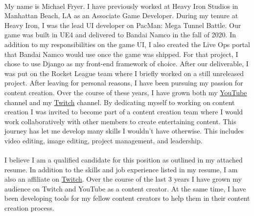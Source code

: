 \paragraph{}
My name is Michael Fryer. I have previously worked at Heavy Iron Studios in Manhattan Beach, LA as an Associate Game Developer. During my tenure at Heavy Iron, I was the lead UI developer on PacMan: Mega Tunnel Battle. Our game was built in UE4 and delivered to Bandai Namco in the fall of 2020. In addition to my responsibilities on the game UI, I also created the Live Ops portal that Bandai Namco would use once the game was shipped. For that project, I chose to use Django as my front-end framework of choice. After our deliverable, I was put on the Rocket League team where I briefly worked on a still unreleased project. After leaving for personal reasons, I have been pursuing my passion for content creation. Over the course of these years, I have grown both my \href{https://youtube.com/@humblehominid}{YouTube} channel and my \href{https://twitch.tv/HumbleHominid}{Twitch} channel. By dedicating myself to working on content creation I was invited to become part of a content creation team where I would work collaboratively with other members to create entertaining content. This journey has let me develop many skills I wouldn't have otherwise. This includes video editing, image editing, project management, and leadership.

\paragraph{}
I believe I am a qualified candidate for this position as outlined in my attached resume. In addition to the skills and job experience listed in my resume, I am also an affiliate on \href{https://twitch.tv/HumbleHominid}{Twitch}. Over the course of the last 3 years I have grown my audience on Twitch and YouTube as a content creator. At the same time, I have been developing tools for my fellow content creators to help them in their content creation process.